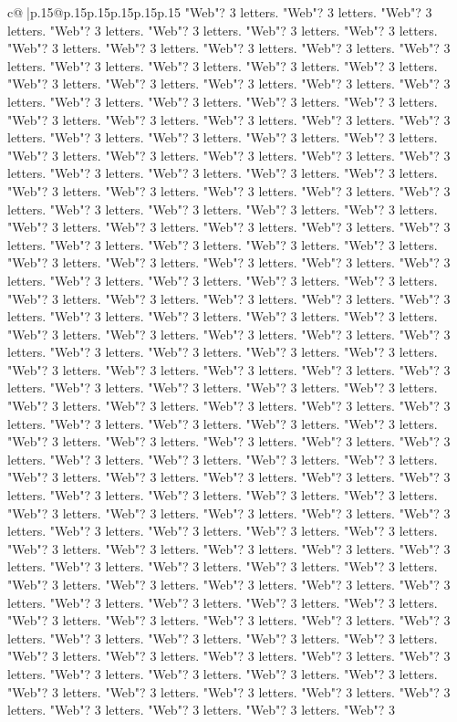 \documentclass{article}
\begin{document}
{\begin{supertabular}{c@{$\;$}|p{.15\linewidth}@{}p{.15\linewidth}p{.15\linewidth}p{.15\linewidth}p{.15\linewidth}p{.15\linewidth}}
{{{"Web"? 3 letters. "Web"? 3 letters. "Web"? 3 letters. "Web"? 3 letters. "Web"? 3 letters. "Web"? 3 letters. "Web"? 3 letters. "Web"? 3 letters. "Web"? 3 letters. "Web"? 3 letters. "Web"? 3 letters. "Web"? 3 letters. "Web"? 3 letters. "Web"? 3 letters. "Web"? 3 letters. "Web"? 3 letters. "Web"? 3 letters. "Web"? 3 letters. "Web"? 3 letters. "Web"? 3 letters. "Web"? 3 letters. "Web"? 3 letters. "Web"? 3 letters. "Web"? 3 letters. "Web"? 3 letters. "Web"? 3 letters. "Web"? 3 letters. "Web"? 3 letters. "Web"? 3 letters. "Web"? 3 letters. "Web"? 3 letters. "Web"? 3 letters. "Web"? 3 letters. "Web"? 3 letters. "Web"? 3 letters. "Web"? 3 letters. "Web"? 3 letters. "Web"? 3 letters. "Web"? 3 letters. "Web"? 3 letters. "Web"? 3 letters. "Web"? 3 letters. "Web"? 3 letters. "Web"? 3 letters. "Web"? 3 letters. "Web"? 3 letters. "Web"? 3 letters. "Web"? 3 letters. "Web"? 3 letters. "Web"? 3 letters. "Web"? 3 letters. "Web"? 3 letters. "Web"? 3 letters. "Web"? 3 letters. "Web"? 3 letters. "Web"? 3 letters. "Web"? 3 letters. "Web"? 3 letters. "Web"? 3 letters. "Web"? 3 letters. "Web"? 3 letters. "Web"? 3 letters. "Web"? 3 letters. "Web"? 3 letters. "Web"? 3 letters. "Web"? 3 letters. "Web"? 3 letters. "Web"? 3 letters. "Web"? 3 letters. "Web"? 3 letters. "Web"? 3 letters. "Web"? 3 letters. "Web"? 3 letters. "Web"? 3 letters. "Web"? 3 letters. "Web"? 3 letters. "Web"? 3 letters. "Web"? 3 letters. "Web"? 3 letters. "Web"? 3 letters. "Web"? 3 letters. "Web"? 3 letters. "Web"? 3 letters. "Web"? 3 letters. "Web"? 3 letters. "Web"? 3 letters. "Web"? 3 letters. "Web"? 3 letters. "Web"? 3 letters. "Web"? 3 letters. "Web"? 3 letters. "Web"? 3 letters. "Web"? 3 letters. "Web"? 3 letters. "Web"? 3 letters. "Web"? 3 letters. "Web"? 3 letters. "Web"? 3 letters. "Web"? 3 letters. "Web"? 3 letters. "Web"? 3 letters. "Web"? 3 letters. "Web"? 3 letters. "Web"? 3 letters. "Web"? 3 letters. "Web"? 3 letters. "Web"? 3 letters. "Web"? 3 letters. "Web"? 3 letters. "Web"? 3 letters. "Web"? 3 letters. "Web"? 3 letters. "Web"? 3 letters. "Web"? 3 letters. "Web"? 3 letters. "Web"? 3 letters. "Web"? 3 letters. "Web"? 3 letters. "Web"? 3 letters. "Web"? 3 letters. "Web"? 3 letters. "Web"? 3 letters. "Web"? 3 letters. "Web"? 3 letters. "Web"? 3 letters. "Web"? 3 letters. "Web"? 3 letters. "Web"? 3 letters. "Web"? 3 letters. "Web"? 3 letters. "Web"? 3 letters. "Web"? 3 letters. "Web"? 3 letters. "Web"? 3 letters. "Web"? 3 letters. "Web"? 3 letters. "Web"? 3 letters. "Web"? 3 letters. "Web"? 3 letters. "Web"? 3 letters. "Web"? 3 letters. "Web"? 3 letters. "Web"? 3 letters. "Web"? 3 letters. "Web"? 3 letters. "Web"? 3 letters. "Web"? 3 letters. "Web"? 3 letters. "Web"? 3 letters. "Web"? 3 letters. "Web"? 3 letters. "Web"? 3 letters. "Web"? 3 letters. "Web"? 3 letters. "Web"? 3 letters. "Web"? 3 letters. "Web"? 3 letters. "Web"? 3 letters. "Web"? 3 letters. "Web"? 3 letters. "Web"? 3 letters. "Web"? 3 letters. "Web"? 3 letters. "Web"? 3 letters. "Web"? 3 letters. "Web"? 3 letters. "Web"? 3 letters. "Web"? 3 letters. "Web"? 3 letters. "Web"? 3 letters. "Web"? 3 letters. "Web"? 3 letters. "Web"? 3 letters. "Web"? 3 letters. "Web"? 3 letters. "Web"? 3 letters. "Web"? 3 letters. "Web"? 3 }}}
\end{supertabular}}
\end{document}
